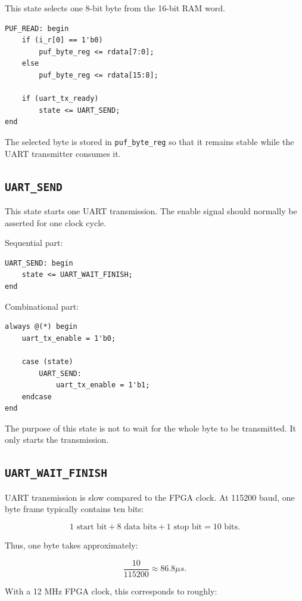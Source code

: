 \documentclass[11pt,a4paper]{article}
\begin{document}
This state selects one 8-bit byte from the 16-bit RAM word.

\begin{lstlisting}
PUF_READ: begin
    if (i_r[0] == 1'b0)
        puf_byte_reg <= rdata[7:0];
    else
        puf_byte_reg <= rdata[15:8];

    if (uart_tx_ready)
        state <= UART_SEND;
end
\end{lstlisting}

The selected byte is stored in \texttt{puf\_byte\_reg} so that it remains stable while the UART transmitter consumes it.

\subsection{\texttt{UART\_SEND}}

This state starts one UART transmission. The enable signal should normally be asserted for one clock cycle.

Sequential part:

\begin{lstlisting}
UART_SEND: begin
    state <= UART_WAIT_FINISH;
end
\end{lstlisting}

Combinational part:

\begin{lstlisting}
always @(*) begin
    uart_tx_enable = 1'b0;

    case (state)
        UART_SEND:
            uart_tx_enable = 1'b1;
    endcase
end
\end{lstlisting}

The purpose of this state is not to wait for the whole byte to be transmitted. It only starts the transmission.

\subsection{\texttt{UART\_WAIT\_FINISH}}

UART transmission is slow compared to the FPGA clock. At 115200 baud, one byte frame typically contains ten bits:

\[
1 \text{ start bit} + 8 \text{ data bits} + 1 \text{ stop bit} = 10 \text{ bits}.
\]

Thus, one byte takes approximately:

\[
\frac{10}{115200} \approx 86.8 \mu s.
\]

With a 12 MHz FPGA clock, this corresponds to roughly:
\end{document}
